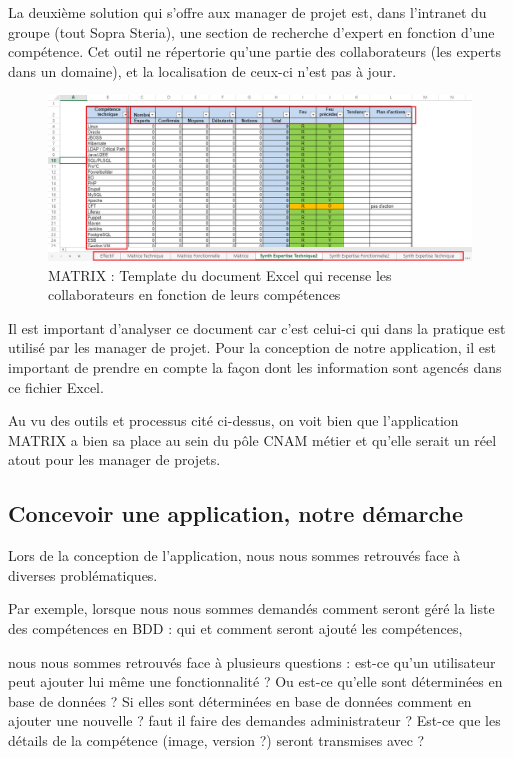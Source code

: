 La deuxième solution qui s'offre aux manager de projet est, dans l'intranet du groupe (tout Sopra Steria), une section de recherche d'expert en fonction d'une compétence. Cet outil ne répertorie qu'une partie des collaborateurs (les experts dans un domaine), et la localisation de ceux-ci n'est pas à jour.

\begin{figure}[!h]
\centering
\includegraphics[width=1\textwidth]{images/MATRIX-excel.png}
\caption{MATRIX : Template du document Excel qui recense les collaborateurs en fonction de leurs compétences}
\end{figure}

Il est important d'analyser ce document car c'est celui-ci qui dans la pratique est utilisé par les manager de projet. Pour la conception de notre application, il est important de prendre en compte la façon dont les information sont agencés dans ce fichier Excel.

Au vu des outils et processus cité ci-dessus, on voit bien que l'application MATRIX a bien sa place au sein du pôle CNAM métier et qu'elle serait un réel atout pour les manager de projets.

\subsection{Concevoir une application, notre démarche}

Lors de la conception de l'application, nous nous sommes retrouvés face à diverses problématiques. 

Par exemple, lorsque nous nous sommes demandés comment seront géré la liste des compétences en BDD : qui et comment seront ajouté les compétences, 

nous nous sommes retrouvés face à plusieurs questions : est-ce qu'un utilisateur peut ajouter lui même une fonctionnalité ? Ou est-ce qu'elle sont déterminées en base de données ? Si elles sont déterminées en base de données comment en ajouter une nouvelle ? faut il faire des demandes administrateur ? Est-ce que les détails de la compétence (image, version ?) seront transmises avec ?

